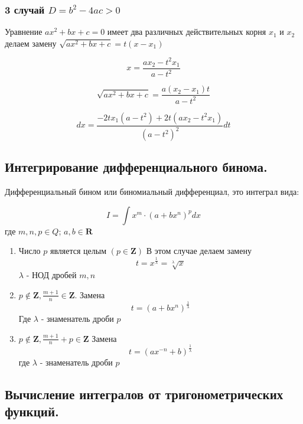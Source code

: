\documentclass[a4paper,12pt]{article}
\theoremstyle{plain} %
\theoremstyle{definition} %
\theoremstyle{remark} %
\begin{document}
\subsubsection*{3 случай $D = b^2 - 4ac > 0$}

Уравнение $ax^2 + bx + c = 0$ имеет два различных действительных корня $x_1$ и $x_2$
делаем замену $\sqrt{ax^2 + bx + c} = t(x - x_1)$

\[
	x = \frac{ax_2 - t^2 x_1}{a - t^2}
\]

\[
	\sqrt{ax^2 + bx + c} = \frac{a(x_2 - x_1)t}{a - t^2}
\]

\[
	dx = \frac{-2tx_1(a - t^2) + 2t(ax_2 - t^2 x_1)}{(a - t^2)^2} dt
\]



\newpage
\subsection*{Интегрирование дифференциального бинома.                                                     }

Дифференциальный бином или биномиальный дифференциал, это интеграл вида:

\[
	I = \int x^m \cdot (a + bx^n)^p dx
\]
где $m,n,p \in Q$; $a, b \in \mathbf{R}$

\begin{enumerate}
	\item Число $p$ является целым $(p \in \mathbf{Z})$
	      В этом случае делаем замену \[ t = x^{\frac{1}{\lambda}} = \sqrt[\lambda]{x} \]
	      $\lambda$ - НОД дробей $m, n$
	\item $p \notin \mathbf{Z}, \frac{m+1}{n} \in \mathbf{Z}$. Замена \[ t = (a + bx^n)^{\frac{1}{\lambda}} \]
	      Где $\lambda$ - знаменатель дроби $p$
	\item $p \notin \mathbf{Z}, \frac{m+1}{n} + p \in \mathbf{Z} $
	      Замена
	      \[ t = (ax^{-n} + b)^{\frac{1}{\lambda}} \]
	      где $\lambda$ - знаменатель дроби $p$
\end{enumerate}



\newpage
\subsection*{Вычисление интегралов от тригонометрических функций.                                         }
\end{document}
